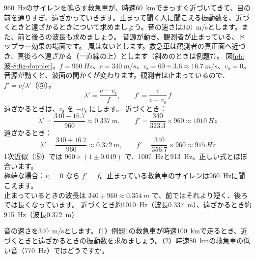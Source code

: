 {}

\label{ph:波-8:ex1}
\begin{phreidai}
\qty{960}{Hz}のサイレンを鳴らす救急車が、時速\qty{60}{km}でまっすぐ近づいてきて、目の前を通りすぎ、遠ざかっていきます。止まって聞く人に聞こえる振動数を、近づくときと遠ざかるときについて求めましょう。音の速さは\qty{340}{m/s}とします。また、前と後ろの波長も求めましょう。
\phbamen
音源が動き、観測者が止まっている、ドップラー効果の場面です。
\phmushi
風はないとします。救急車は観測者の真正面へ近づき、真後ろへ遠ざかる（一直線の上）とします（斜めのときは例題7）。
\phzu
図\ref{ph:波-8:fig-doppler}。$f=\qty{960}{Hz}$、$c=\qty{340}{m/s}$、$v_{\mathrm s}=60\div3.6\approx\qty{16.7}{m/s}$、$v_{\mathrm o}=0$。
\phriyu
音源が動くと、波面の間かくが変わります。観測者は止まっているので、$f'=c/\lambda'$（⑤）。
\phtateru
\[\lambda'=\frac{c-v_{\mathrm s}}{f},\qquad f'=\frac{c}{c-v_{\mathrm s}}\,f\]
遠ざかるときは、$v_{\mathrm s}$ を $-v_{\mathrm s}$ にします。
\phtoku
近づくとき：\[\lambda'=\frac{340-16.7}{960}\approx\qty{0.337}{m},\qquad f'=\frac{340}{323.3}\times960\approx\qty{1010}{Hz}\]
遠ざかるとき：\[\lambda'=\frac{340+16.7}{960}\approx\qty{0.372}{m},\qquad f'=\frac{340}{356.7}\times960\approx\qty{915}{Hz}\]
\phtashikame
1次近似（⑤）では $960\times(1\pm0.049)$ で、\qty{1007}{Hz}と\qty{913}{Hz}。正しい式とほぼ合います。\\
極端な場合：$v_{\mathrm s}=0$ なら $f'=f$。止まっている救急車のサイレンは\qty{960}{Hz}に聞こえます。\\
止まっているときの波長は $340\div960\approx\qty{0.354}{m}$ で、前ではそれより短く、後ろでは長くなっています。
\kotae 近づくとき約\qty{1010}{Hz}（波長\qty{0.337}{m}）、遠ざかるとき約\qty{915}{Hz}（波長\qty{0.372}{m}）
\end{phreidai}
\begin{jibun}
音の速さを\qty{340}{m/s}とします。（1）例題1の救急車が時速\qty{100}{km}で走るとき、近づくときと遠ざかるときの振動数を求めましょう。（2）時速\qty{80}{km}の救急車の低い音（\qty{770}{Hz}）ではどうですか。
\end{jibun}

